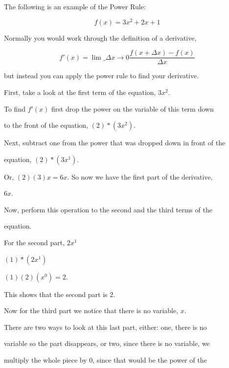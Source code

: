 {{{{The following is an example of the Power Rule:



$$f(x)=3x^2 + 2x + 1$$



Normally you would work through the definition of a derivative,



$$f'(x)=\lim\_{{\Delta}x\rightarrow 0} \frac{f(x+{\Delta}x)-f(x)}{{\Delta}x}$$



but instead you can apply the power rule to find your derivative.



First, take a look at the first term of the equation, $3x^2.$



To find $f'(x)$ first drop the power on the variable of this term down

to the front of the equation, $(2) * (3x^2).$



Next, subtract one from the power that was dropped down in front of the

equation, $(2) * (3x^1).$



Or, $(2)(3)x = 6x.$ So now we have the first part of the derivative,

$6x.$



Now, perform this operation to the second and the third terms of the

equation.



For the second part, $2x^1$



$(1) * (2x^1)$



$(1)(2)(x^0) = 2.$



This shows that the second part is $2.$



Now for the third part we notice that there is no variable, $x.$



There are two ways to look at this last part, either: one, there is no

variable so the part disappears, or two, since there is no variable, we

multiply the whole piece by 0, since that would be the power of the

}}}}
